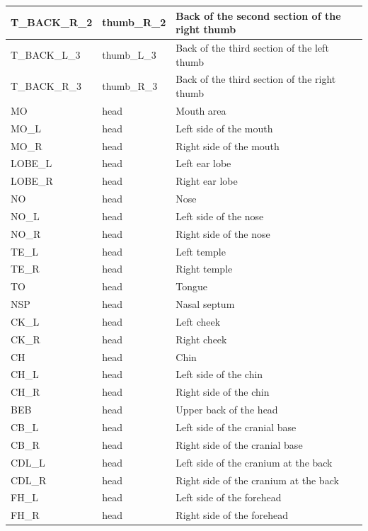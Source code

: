 \documentclass[../main.tex]{subfiles}
\begin{document}
\begin{longtable}{|p{2cm}|p{3cm}|p{5cm}|}
    T\_BACK\_R\_2 & thumb\_R\_2 & Back of the second section of the right thumb \\ \hline
    T\_BACK\_L\_3 & thumb\_L\_3 & Back of the third section of the left thumb \\ \hline
    T\_BACK\_R\_3 & thumb\_R\_3 & Back of the third section of the right thumb \\ \hline
    MO & head & Mouth area \\ \hline
    MO\_L & head & Left side of the mouth \\ \hline
    MO\_R & head & Right side of the mouth \\ \hline
    LOBE\_L & head & Left ear lobe \\ \hline
    LOBE\_R & head & Right ear lobe \\ \hline
    NO & head & Nose \\ \hline
    NO\_L & head & Left side of the nose \\ \hline
    NO\_R & head & Right side of the nose \\ \hline
    TE\_L & head & Left temple \\ \hline
    TE\_R & head & Right temple \\ \hline
    TO & head & Tongue \\ \hline
    NSP & head & Nasal septum \\ \hline
    CK\_L & head & Left cheek \\ \hline
    CK\_R & head & Right cheek \\ \hline
    CH & head & Chin \\ \hline
    CH\_L & head & Left side of the chin \\ \hline
    CH\_R & head & Right side of the chin \\ \hline
    BEB & head & Upper back of the head \\ \hline
    CB\_L & head & Left side of the cranial base \\ \hline
    CB\_R & head & Right side of the cranial base \\ \hline
    CDL\_L & head & Left side of the cranium at the back \\ \hline
    CDL\_R & head & Right side of the cranium at the back \\ \hline
    FH\_L & head & Left side of the forehead \\ \hline
    FH\_R & head & Right side of the forehead \\ \hline
    \end{longtable}
\end{document}
